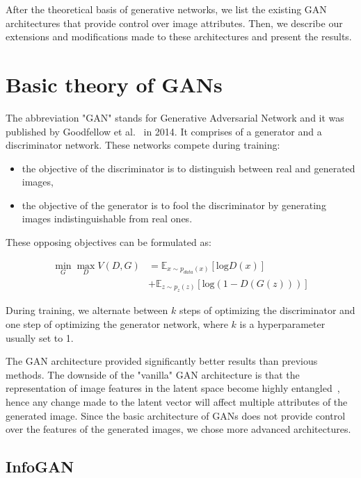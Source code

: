 \documentclass{egpubl}
\begin{document}
After the theoretical basis of generative networks, we list the existing GAN architectures that provide control over image attributes. Then, we describe our extensions and modifications made to these architectures and present the results.

\section{Basic theory of GANs}
The abbreviation "GAN" stands for Generative Adversarial Network and it was published by Goodfellow et al.~\cite{goodfellow2014generative} in 2014. It comprises of a generator and a discriminator network. These networks compete during training:

\begin{itemize}
	\item the objective of the discriminator is to distinguish between real and generated images,
	\item the objective of the generator is to fool the discriminator by generating images indistinguishable from real ones. 
\end{itemize}

These opposing objectives can be formulated as:

\begin{equation}
\begin{aligned}
\min_G \max_D V(D,G) &= \mathbb{E}_{x\sim p_{data}(x)}\left[ \mathrm{log}D(x) \right] \\
&+ \mathbb{E}_{z\sim p_{z}(z)}\left[ \mathrm{log}(1-D(G(z)))\right]
\end{aligned}
\end{equation}

During training, we alternate between $k$ steps of optimizing the discriminator and one step of optimizing the generator network, where $k$ is a hyperparameter usually set to 1.

The GAN architecture provided significantly better results than previous methods. The downside of the "vanilla" GAN architecture is that the representation of image features in the latent space become highly entangled~\cite{radford2015unsupervised}, hence any change made to the latent vector will affect multiple attributes of the generated image. Since the basic architecture of GANs does not provide control over the features of the generated images, we chose more advanced architectures.


\subsection{InfoGAN}
\end{document}
